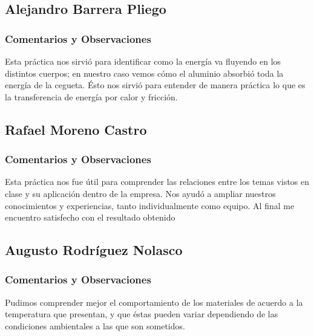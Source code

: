 \subsection{Alejandro Barrera Pliego}
\subsubsection{Comentarios y Observaciones}
Esta pr\'actica nos sirvi\'o para identificar como la energ\'ia va fluyendo en los distintos cuerpos; en nuestro caso
vemos c\'omo el aluminio absorbi\'o toda la energ\'ia de la cegueta. \'Esto nos sirvi\'o para entender de manera pr\'actica
lo que es la transferencia de energ\'ia por calor y fricci\'on.

\subsection{Rafael Moreno Castro}
\subsubsection{Comentarios y Observaciones}
Esta pr\'actica nos fue útil para comprender las relaciones entre los temas vistos en
clase y su aplicaci\'on dentro de la empresa. Nos ayud\'o a ampliar nuestros conocimientos
y experiencias, tanto individualmente como equipo. Al final me encuentro satisfecho con
el resultado obtenido

\subsection{Augusto Rodr\'iguez Nolasco}
\subsubsection{Comentarios y Observaciones}
Pudimos comprender mejor el comportamiento de los materiales de acuerdo a la temperatura que presentan, y
que \'estas pueden variar dependiendo de las condiciones ambientales a las que son sometidos.